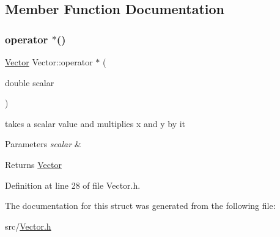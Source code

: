 \subsection{Member Function Documentation}
\mbox{\label{struct_vector_a4f5f72401cce567d96b50b95109c9bb3}} 
\subsubsection{\texorpdfstring{operator $\ast$()}{operator *()}}
{\footnotesize\ttfamily \mbox{\hyperlink{struct_vector}{Vector}} Vector\+::operator $\ast$ (\begin{DoxyParamCaption}\item[{double}]{scalar }\end{DoxyParamCaption})\hspace{0.3cm}{\ttfamily [inline]}}



takes a scalar value and multiplies x and y by it 


\begin{DoxyParams}{Parameters}
{\em scalar} & \\
\hline
\end{DoxyParams}
\begin{DoxyReturn}{Returns}
\mbox{\hyperlink{struct_vector}{Vector}} 
\end{DoxyReturn}


Definition at line 28 of file Vector.\+h.


\begin{DoxyCode}{0}

\end{DoxyCode}


The documentation for this struct was generated from the following file\+:\begin{DoxyCompactItemize}
\item 
src/\mbox{\hyperlink{_vector_8h}{Vector.\+h}}\end{DoxyCompactItemize}
